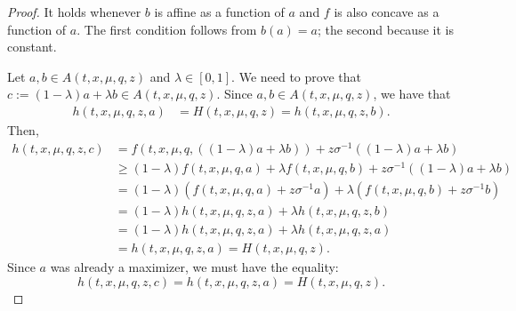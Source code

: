 \documentclass[10pt,a4paper]{amsart}
\begin{document}
\begin{proof}
    It holds whenever \( b \) is affine as a function of \( a \) and \( f \) is also concave as a function of \( a \). The first condition follows from \( b(a) = a \); the second because it is constant.

    Let \( a,b \in A(t,x,\mu,q,z) \) and \( \lambda \in [0,1] \). We need to prove that \( c := (1-\lambda) a + \lambda b \in A(t,x,\mu,q,z) \).
 Since \( a,b \in A(t,x,\mu,q,z) \), we have that  
    \begin{align*}
        h(t,x,\mu,q,z,a) &= H(t,x,\mu,q,z) = h(t,x,\mu,q,z,b).
    \end{align*}
    Then,  
    \begin{align*}
        h(t,x,\mu,q,z,c)
        &= f(t,x,\mu,q,((1-\lambda) a + \lambda b)) + z \sigma^{-1}((1-\lambda) a + \lambda b)\\
        &\geq (1-\lambda) f(t,x,\mu,q,a) + \lambda f(t,x,\mu,q,b) + z \sigma^{-1}((1-\lambda) a + \lambda b)\\
        &= (1-\lambda) (f(t,x,\mu,q,a) + z \sigma^{-1} a) + \lambda (f(t,x,\mu,q,b) + z \sigma^{-1} b)\\
        &= (1-\lambda) h(t,x,\mu,q,z,a) + \lambda h(t,x,\mu,q,z,b)\\
        &= (1-\lambda) h(t,x,\mu,q,z,a) + \lambda h(t,x,\mu,q,z,a)\\
        &= h(t,x,\mu,q,z,a) = H(t,x,\mu,q,z).
    \end{align*}
    Since \( a \) was already a maximizer, we must have the equality:  
    \[
    h(t,x,\mu,q,z,c) = h(t,x,\mu,q,z,a) = H(t,x,\mu,q,z).
    \]
    
    

\end{proof}
\end{document}

